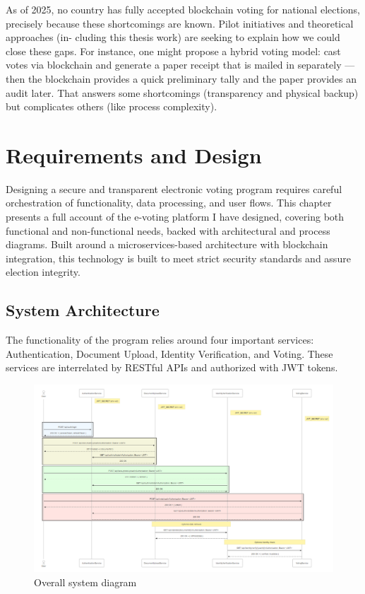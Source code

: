 \documentclass[a4paper,10pt]{report}
\begin{document}
 As of 2025, no country has fully accepted blockchain voting for national elections, precisely because these shortcomings are known.  Pilot initiatives and theoretical approaches (in- cluding this thesis work) are seeking to explain how we could close these gaps.  For instance, one might propose a hybrid voting model: cast votes via blockchain and generate a paper receipt that is mailed in separately — then the blockchain provides a quick preliminary tally and the paper provides an audit later.  That answers some shortcomings (transparency and physical backup) but complicates others (like process complexity).

 \chapter{Requirements and Design}

Designing a secure and transparent electronic voting program requires careful orchestration of functionality, data processing, and user flows.  This chapter presents a full account of the e-voting platform I have designed, covering both functional and non-functional needs, backed with architectural and process diagrams.  Built around a microservices-based architecture with blockchain integration, this technology is built to meet strict security standards and assure election integrity.

 \section{System Architecture}

The functionality of the program relies around four important services: Authentication, Document Upload, Identity Verification, and Voting.  These services are interrelated by RESTful APIs and authorized with JWT tokens.
\begin{figure}[htbp]
  \centering
  \includegraphics[width=1.0\textwidth]{fullDiagram.png}
  \caption{Overall system diagram}
  \label{fig:full}
\end{figure}
\end{document}

